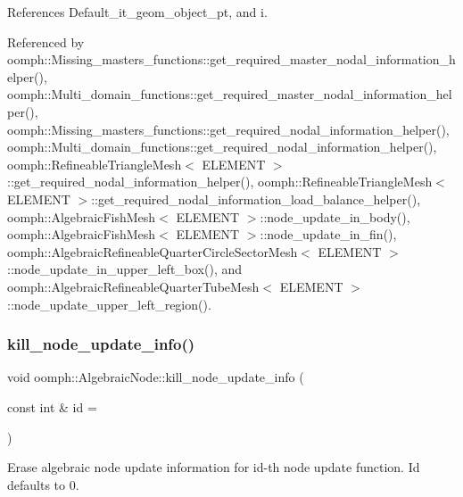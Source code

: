 References Default\+\_\+it\+\_\+geom\+\_\+object\+\_\+pt, and i.



Referenced by oomph\+::\+Missing\+\_\+masters\+\_\+functions\+::get\+\_\+required\+\_\+master\+\_\+nodal\+\_\+information\+\_\+helper(), oomph\+::\+Multi\+\_\+domain\+\_\+functions\+::get\+\_\+required\+\_\+master\+\_\+nodal\+\_\+information\+\_\+helper(), oomph\+::\+Missing\+\_\+masters\+\_\+functions\+::get\+\_\+required\+\_\+nodal\+\_\+information\+\_\+helper(), oomph\+::\+Multi\+\_\+domain\+\_\+functions\+::get\+\_\+required\+\_\+nodal\+\_\+information\+\_\+helper(), oomph\+::\+Refineable\+Triangle\+Mesh$<$ E\+L\+E\+M\+E\+N\+T $>$\+::get\+\_\+required\+\_\+nodal\+\_\+information\+\_\+helper(), oomph\+::\+Refineable\+Triangle\+Mesh$<$ E\+L\+E\+M\+E\+N\+T $>$\+::get\+\_\+required\+\_\+nodal\+\_\+information\+\_\+load\+\_\+balance\+\_\+helper(), oomph\+::\+Algebraic\+Fish\+Mesh$<$ E\+L\+E\+M\+E\+N\+T $>$\+::node\+\_\+update\+\_\+in\+\_\+body(), oomph\+::\+Algebraic\+Fish\+Mesh$<$ E\+L\+E\+M\+E\+N\+T $>$\+::node\+\_\+update\+\_\+in\+\_\+fin(), oomph\+::\+Algebraic\+Refineable\+Quarter\+Circle\+Sector\+Mesh$<$ E\+L\+E\+M\+E\+N\+T $>$\+::node\+\_\+update\+\_\+in\+\_\+upper\+\_\+left\+\_\+box(), and oomph\+::\+Algebraic\+Refineable\+Quarter\+Tube\+Mesh$<$ E\+L\+E\+M\+E\+N\+T $>$\+::node\+\_\+update\+\_\+upper\+\_\+left\+\_\+region().

\mbox{\label{classoomph_1_1AlgebraicNode_a9de65e71efa3050187d41f05602accfe}} 
\subsubsection{\texorpdfstring{kill\+\_\+node\+\_\+update\+\_\+info()}{kill\_node\_update\_info()}}
{\footnotesize\ttfamily void oomph\+::\+Algebraic\+Node\+::kill\+\_\+node\+\_\+update\+\_\+info (\begin{DoxyParamCaption}\item[{const int \&}]{id = {} }\end{DoxyParamCaption})\hspace{0.3cm}{\ttfamily [inline]}}



Erase algebraic node update information for id-\/th node update function. Id defaults to 0. 



